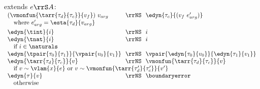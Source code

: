 \begin{flushleft}
\begin{minipage}[t]{\columnwidth}
 extends $e \rrS A$:\\
$\begin{array}{l@{~~}c@{~~}l}
  (\vmonfun{\tarr{\tau_d}{\tau_c}}{v_f})~v_{arg} & \rrNS & \edyn{\tau_c}{(v_f~e_{arg}')}
\\ \multicolumn{3}{l}{\mbox{\quad where $e_{arg}' = \esta{\tau_d}{v_{arg}}$}}
\\[0.8ex]
  \edyn{\tint}{i} & \rrNS & i
\\
  \edyn{\tnat}{i} & \rrNS & i
\\ \multicolumn{3}{l}{\mbox{\quad if $i \in \naturals$}}
\\
  \edyn{\tpair{\tau_0}{\tau_1}}{\vpair{v_0}{v_1}} & \rrNS & \vpair{\edyn{\tau_0}{v_0}}{\edyn{\tau_1}{v_1}}
\\
  \edyn{\tarr{\tau_d}{\tau_c}}{v} & \rrNS & \vmonfun{\tarr{\tau_d}{\tau_c}}{v}
\\ \multicolumn{3}{l}{\mbox{\quad if $v \sim \vlam{x}{e}$ or $v \sim \vmonfun{\tarr{\tau_d'}{\tau_c'}}{v'}$}}
\\
  \edyn{\tau}{v} & \rrNS & \boundaryerror
\\ \multicolumn{3}{l}{\mbox{\quad otherwise}}
\end{array}$
\end{minipage}

\end{flushleft}
